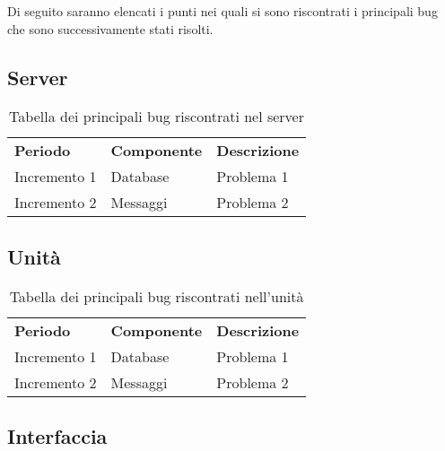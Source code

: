 Di seguito saranno elencati i punti nei quali si sono riscontrati i principali bug che sono successivamente stati risolti.

\subsection{Server}

\begin{table} [!ht]
	\begin{center}
		\begin{tabular} { m{3cm} m{3cm} m{6cm}  }
			\rowcolor{lightgray}
			\textbf{Periodo} & \textbf{Componente} & \textbf{Descrizione}\\
			
			Incremento 1 & Database & Problema 1 \\
			Incremento 2 & Messaggi & Problema 2 \\
								
		\end{tabular}
	\end{center}
	\caption{Tabella dei principali bug riscontrati nel server}
\end{table}

\subsection{Unità}

\begin{table} [!ht]
	\begin{center}
		\begin{tabular} { m{3cm} m{3cm} m{6cm}  }
			\rowcolor{lightgray}
			\textbf{Periodo} & \textbf{Componente} & \textbf{Descrizione}\\
			
			Incremento 1 & Database & Problema 1 \\
			Incremento 2 & Messaggi & Problema 2 \\
			
		\end{tabular}
	\end{center}
	\caption{Tabella dei principali bug riscontrati nell'unità}
\end{table}

\subsection{Interfaccia}

